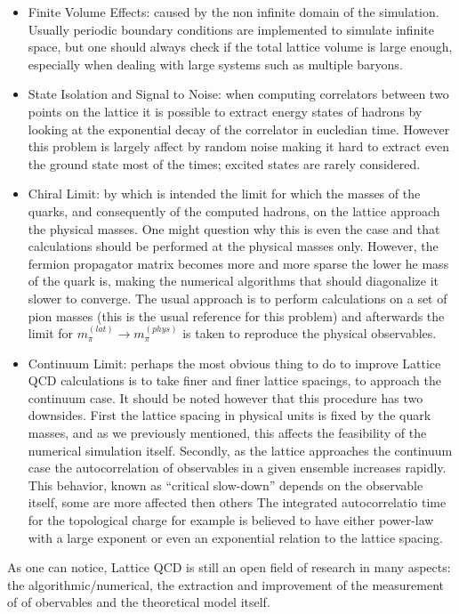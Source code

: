 \begin{itemize}
    \item Finite Volume Effects: caused by the non infinite domain of the simulation. Usually periodic boundary conditions are implemented to simulate infinite space, but one should always check if the total lattice volume is large enough, especially when dealing with large systems such as multiple baryons.
    \item State Isolation and Signal to Noise: when computing correlators between two points on the lattice it is possible to extract energy  states of hadrons by looking at the exponential decay of the correlator in eucledian time. However this problem is largely affect by random noise making it hard to extract even the ground state most of the times; excited states are rarely considered.
    \item Chiral Limit: by which is intended the limit for which the masses of the quarks, and consequently of the computed hadrons, on the lattice approach the physical masses. One might question why this is even the case and that calculations should be performed at the physical masses only. However, the fermion propagator matrix becomes more and more sparse the lower he mass of the quark is, making the numerical algorithms that should diagonalize it slower to converge. The usual approach is to perform calculations on a set of pion masses (this is the usual reference for this problem) and afterwards the limit for $m_\pi^{(lat)} \rightarrow m_\pi^{(phys)}$ is taken to reproduce the physical observables.
    \item Continuum Limit: perhaps the most obvious thing to do to improve Lattice QCD calculations is to take finer and finer lattice spacings, to approach the continuum case. It should be noted however that this procedure has two downsides. First the lattice spacing in physical units is fixed by the quark masses, and as we previously mentioned, this affects the feasibility of the numerical simulation itself. Secondly, as the lattice approaches the continuum case the autocorrelation of observables in a given ensemble increases rapidly. This behavior, known as ``critical slow-down'' depends on the observable itself, some are more affected then others  The integrated autocorrelatio time for the topological charge for example is believed to have either  power-law with a large exponent or even an exponential relation to the lattice spacing. 
\end{itemize}
As one can notice, Lattice QCD is still an open field of research in many aspects: the algorithmic/numerical, the extraction and improvement of the measurement of of obervables and the theoretical model itself. 

